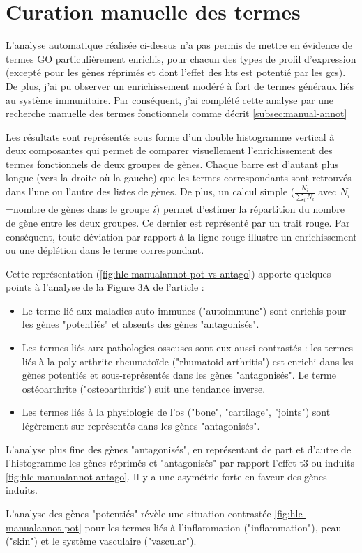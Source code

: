 \documentclass[../main.tex]{subfiles}
\begin{document}
\section{Curation manuelle des termes}
L'analyse automatique réalisée ci-dessus n'a pas permis de mettre en évidence de termes GO particulièrement enrichis, pour chacun des types de profil d'expression (excepté pour les gènes réprimés et dont l'effet des \glspl{ht} est potentié par les \glspl{gc}).
De plus, j'ai pu observer un enrichissement modéré à fort de termes généraux liés au système immunitaire. Par conséquent, j'ai complété cette analyse par une recherche manuelle des termes fonctionnels comme décrit \autoref{subsec:manual-annot}
\par
Les résultats sont représentés sous forme d'un double histogramme vertical à deux composantes qui permet de comparer visuellement l'enrichissement des termes fonctionnels de deux groupes de gènes.
Chaque barre est d'autant plus longue (vers la droite où la gauche) que les termes correspondants sont retrouvés dans l'une ou l'autre des listes de gènes.
De plus, un calcul simple ($\frac{N_{i}}{\sum_{i}N_{i}}$ avec $N_i$=nombre de gènes dans le groupe $i$) permet d'estimer la répartition du nombre de gène entre les deux groupes.
Ce dernier est représenté par un trait rouge. Par conséquent, toute déviation par rapport à la ligne rouge illustre un enrichissement ou une déplétion dans le terme correspondant.
\par
Cette représentation (\autoref{fig:hlc-manualannot-pot-vs-antago}) apporte quelques points à l'analyse de la Figure 3A de l'article :
\begin{itemize} 
\item Le terme lié aux maladies auto-immunes ("autoimmune") sont enrichis pour les gènes "potentiés" et absents des gènes "antagonisés". 
\item Les termes liés aux pathologies osseuses sont eux aussi contrastés :
les termes liés à la poly-arthrite rheumatoïde ("rhumatoid arthritis") est enrichi dans les gènes potentiés et sous-représentés dans les gènes "antagonisés".
Le terme ostéoarthrite ("osteoarthritis") suit une tendance inverse.
\item Les termes liés à la physiologie de l'os ("bone", "cartilage", "joints") sont légèrement sur-représentés dans les gènes "antagonisés".
\end{itemize}


L'analyse plus fine des gènes "antagonisés", en représentant de part et d'autre de l'histogramme les gènes réprimés et "antagonisés" par rapport l'effet \gls{t3} ou induits \autoref{fig:hlc-manualannot-antago}.
Il y a une asymétrie forte en faveur des gènes induits.



L'analyse des gènes "potentiés" révèle une situation contrastée \autoref{fig:hlc-manualannot-pot} pour les termes liés à l'inflammation ("inflammation"), peau ("skin") et le système vasculaire ("vascular"). 


\end{document}

